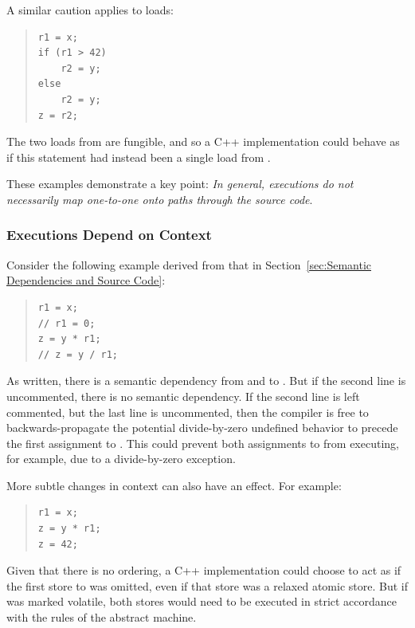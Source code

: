 \documentclass[10]{article}
\begin{document}
A similar caution applies to loads:

\begin{quote}
\begin{verbatim}
r1 = x;
if (r1 > 42)
    r2 = y;
else
    r2 = y;
z = r2;
\end{verbatim}
\end{quote}

The two loads from  are fungible, and so a C++ implementation
could behave as if this  statement had instead been a single load
from .

These examples demonstrate a key point: 
\emph{In general, executions do not necessarily map one-to-one onto
paths through the source code}.%

\subsubsection{Executions Depend on Context}
\label{sec:Executions Depend on Context}

Consider the following example derived from that in
Section~\ref{sec:Semantic Dependencies and Source Code}:

\begin{quote}
\begin{verbatim}
r1 = x;
// r1 = 0;
z = y * r1;
// z = y / r1;
\end{verbatim}
\end{quote}

As written, there is a semantic dependency from  and 
to .
But if the second line is uncommented, there is no semantic
dependency.
If the second line is left commented, but the last line is uncommented,
then the compiler is free to backwards-propagate the potential
divide-by-zero undefined behavior to precede the first assignment
to .
This could prevent both assignments to  from executing, for example,
due to a divide-by-zero exception.

More subtle changes in context can also have an effect.
For example:

\begin{quote}
\begin{verbatim}
r1 = x;
z = y * r1;
z = 42;
\end{verbatim}
\end{quote}

Given that there is no ordering, a C++ implementation could choose to
act as if the first store to  was omitted, even if that store was
a relaxed atomic store.
But if  was marked volatile, both stores would need to be executed
in strict accordance with the rules of the abstract machine.
\end{document}
